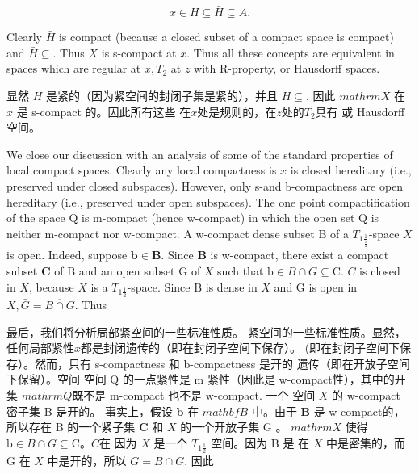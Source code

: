 \documentclass[options]{article}
\begin{document}
		\[
				x \in H \subseteq \bar{H} \subseteq A .
		\]
\begin{paracol}{2}
	\begin{en}
		Clearly $\bar{H}$ is compact (because a closed subset of a compact space is compact) and
		$\bar{H} \subseteq$. Thus $X$ is s-compact at $x$. Thus all these
		concepts are equivalent in spaces which are regular at $x, T_2$ at $z$ with
		R-property, or Hausdorff spaces.
	\end{en}
	\begin{cn}
		显然 $\bar{H}$ 是紧的（因为紧空间的封闭子集是紧的），并且
		$\bar{H} \subseteq$. 因此 $mathrm{X}$ 在 $x$ 是 s-compact 的。因此所有这些
		在$x$处是规则的，在$z$处的$T_2$具有
		或 Hausdorff 空间。\end{cn}

	\begin{en}
		We close our discussion with an analysis of some of the standard properties of local
		compact spaces. Clearly any local compactness is $x$ is closed hereditary
		(i.e., preserved under closed subspaces). However, only s-and b-compactness are open
		hereditary (i.e., preserved under open subspaces). The one point compactification of the
		space $\mathrm{Q}$ is m-compact (hence w-compact) in which the open set
		$\mathrm{Q}$ is neither m-compact nor $\mathrm{w}$-compact. A w-compact dense
		subset B of a $T_{1 \frac{1}{\frac{1}{2}}}$-space $X$ is open.
		Indeed, suppose $\mathbf{b} \in \mathbf{B}$. Since $\mathbf{B}$ is w-compact, there exist
		a compact subset $\mathbf{C}$ of $\mathrm{B}$ and an open subset $\mathrm{G}$ of
		$X$ such that $\mathrm{b} \in B \cap G \subseteq \mathrm{C}$. $C$ is closed in
		$X$, because $X$ is a $T_{1 \frac{1}{2}}$-space. Since $\mathrm{B}$ is
		dense in $X$ and $\mathrm{G}$ is open in $X, \bar{G}=\overline{B \cap
			G}$. Thus

	\end{en}
	\begin{cn}
		最后，我们将分析局部紧空间的一些标准性质。
		紧空间的一些标准性质。显然，任何局部紧性$x$都是封闭遗传的（即在封闭子空间下保存）。
		(即在封闭子空间下保存）。然而，只有 s-compactness 和 b-compactness 是开的
		遗传（即在开放子空间下保留）。空间
		空间 $\mathrm{Q}$ 的一点紧性是 m 紧性（因此是 w-compact性），其中的开集
		$mathrm{Q}$既不是 m-compact 也不是 $\mathrm{w}$-compact. 一个
		空间 $X$ 的 w-compact 密子集 B 是开的。
		事实上，假设 $\mathbf{b}$ 在 $mathbf{B}$ 中。由于 $\mathbf{B}$ 是 w-compact的，所以存在
		$\mathrm{B}$ 的一个紧子集 $\mathbf{C}$ 和 $X$ 的一个开放子集 $\mathrm{G}$ 。
		$mathrm{X}$ 使得 $\mathrm{b} \in B \cap G \subseteq \mathrm{C}$。$C$在
		因为 $X$ 是一个 $T_{1 \frac{1}{2}}$ 空间。因为 $\mathrm{B}$ 是
		在 $X$ 中是密集的，而 $\mathrm{G}$ 在 $X$ 中是开的，所以 $\bar{G}=\overline{B \cap
			G}$. 因此
	\end{cn}
\end{paracol}
\end{document}
